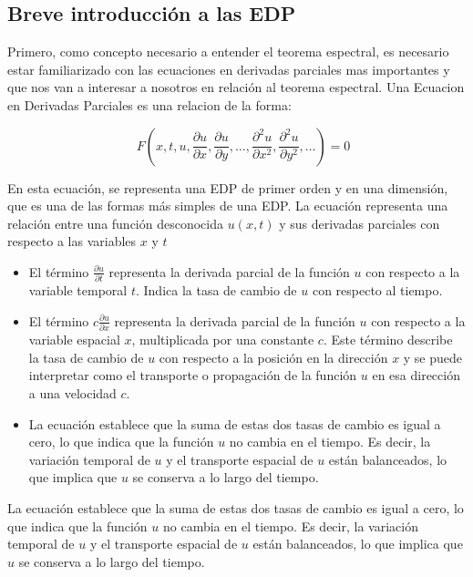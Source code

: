 \documentclass{article}
\begin{document}
    \subsection{Breve introducción a las EDP}
    Primero, como concepto necesario a entender el teorema espectral, es necesario estar familiarizado con las ecuaciones en derivadas parciales mas importantes y que nos van a interesar a nosotros en relación al teorema espectral.
    Una Ecuacion en Derivadas Parciales es una relacion de la forma:
    
    \begin{equation}
        \quad F\left(x, t, u, \frac{\partial u}{\partial x}, \frac{\partial u}{\partial y}, \ldots, \frac{\partial^2 u}{\partial x^2}, \frac{\partial^2 u}{\partial y^2}, \ldots\right) = 0
        \end{equation}
        
        En esta ecuación, se representa una EDP de primer orden y en una dimensión, que es una de las formas más simples de una EDP. La ecuación representa una relación entre una función desconocida $u(x,t)$ y sus derivadas parciales con respecto a las variables $x$ y $t$
            
        \begin{itemize}
            \item El término $\frac{\partial u}{\partial t}$ representa la derivada parcial de la función $u$ con respecto a la variable temporal $t$. Indica la tasa de cambio de $u$ con respecto al tiempo.
            
            \item El término $c\frac{\partial u}{\partial x}$ representa la derivada parcial de la función $u$ con respecto a la variable espacial $x$, multiplicada por una constante $c$. Este término describe la tasa de cambio de $u$ con respecto a la posición en la dirección $x$ y se puede interpretar como el transporte o propagación de la función $u$ en esa dirección a una velocidad $c$.
            
            \item La ecuación establece que la suma de estas dos tasas de cambio es igual a cero, lo que indica que la función $u$ no cambia en el tiempo. Es decir, la variación temporal de $u$ y el transporte espacial de $u$ están balanceados, lo que implica que $u$ se conserva a lo largo del tiempo.
        \end{itemize}
        La ecuación establece que la suma de estas dos tasas de cambio es igual a cero, lo que indica que la función $u$ no cambia en el tiempo. Es decir, la variación temporal de $u$ y el transporte espacial de $u$ están balanceados, lo que implica que $u$ se conserva a lo largo del tiempo.
 
\end{document}
